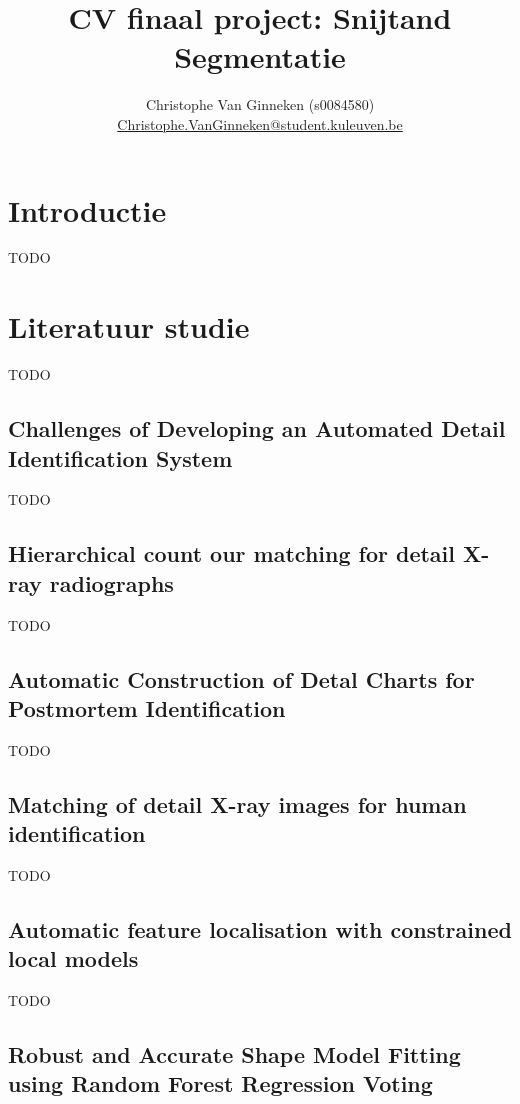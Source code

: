 \documentclass[10pt,a4paper]{article}
\author{Christophe Van Ginneken (s0084580) \\
	\url{Christophe.VanGinneken@student.kuleuven.be} }
\title{CV finaal project: Snijtand Segmentatie}
\begin{document}
\maketitle

\vspace{-1cm}
\section{Introductie}

TODO

\section{Literatuur studie}

TODO

\subsection{Challenges of Developing an Automated Detail Identification System}

TODO

\subsection{Hierarchical count our matching for detail X-ray radiographs}

TODO

\subsection{Automatic Construction of Detal Charts for Postmortem Identification}

TODO

\subsection{Matching of detail X-ray images for human identification}

TODO

\subsection{Automatic feature localisation with constrained local models}

TODO

\subsection{Robust and Accurate Shape Model Fitting using Random Forest Regression Voting}
\end{document}
